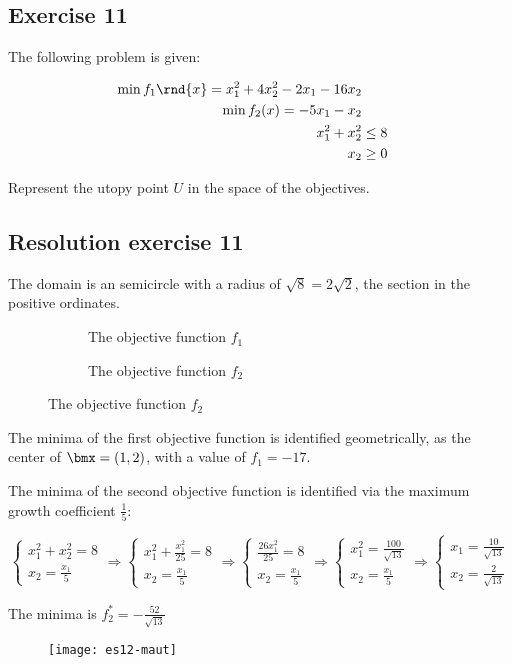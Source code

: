 \documentclass[\main/main.tex]{subfiles}
\begin{document}
\subsection{Exercise 11}
The following problem is given:

\begin{align*}
  \min f_1\rnd{x} = x_1^2 + 4x_2^2 -2x_1 -16x_2 \\
  \min f_2(x) = -5x_1 -x_2                      \\
  x_1^2 + x_2^2 & \leq 8                        \\
  x_2           & \geq 0                        \\
\end{align*}


Represent the utopy point $U$ in the space of the objectives.

\subsection{Resolution exercise 11}
The domain is an semicircle with a radius of $\sqrt{8} = 2\sqrt{2}$, the section in the positive ordinates.

\begin{figure}
  \begin{subfigure}{0.49\textwidth}
    \caption{The objective function $f_1$}
  \end{subfigure}
  \begin{subfigure}{0.49\textwidth}
    \caption{The objective function $f_2$}
  \end{subfigure}
\end{figure}

The minima of the first objective function is identified geometrically, as the center of $\bmx = (1,2)$, with a value of $f_1 = -17$.

The minima of the second objective function is identified via the maximum growth coefficient $\frac{1}{5}$:

\[
  \begin{cases}
    x_1^2+x_2^2 = 8 \\
    x_2 = \frac{x_1}{5}
  \end{cases}
  \Rightarrow
  \begin{cases}
    x_1^2+\frac{x^2_1}{25} = 8 \\
    x_2 = \frac{x_1}{5}
  \end{cases}
  \Rightarrow
  \begin{cases}
    \frac{26x^2_1}{25} = 8 \\
    x_2 = \frac{x_1}{5}
  \end{cases}
  \Rightarrow
  \begin{cases}
    x^2_1 = \frac{100}{\sqrt{13}} \\
    x_2 = \frac{x_1}{5}
  \end{cases}
  \Rightarrow
  \begin{cases}
    x_1 = \frac{10}{\sqrt{13}} \\
    x_2 = \frac{2}{\sqrt{13}}
  \end{cases}
\]

The minima is $f_2^{*} = -\frac{52}{\sqrt{13}}$

\begin{figure}
  \texttt{[image: es12-maut]}
\end{figure}
\end{document}
